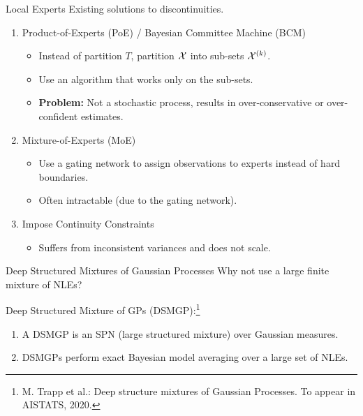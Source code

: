 \begin{frame}{Local Experts}
Existing solutions to discontinuities.
\begin{enumerate}
    \item Product-of-Experts (PoE) / Bayesian Committee Machine (BCM)
  \begin{itemize}
    \item Instead of partition $T$, partition $\mathcal{X}$ into sub-sets $\mathcal{X}^{(k)}$.
    \item Use an algorithm that works only on the sub-sets.
    \item \textbf{Problem:} Not a stochastic process, results in over-conservative or over-confident estimates.
  \end{itemize}
  \item Mixture-of-Experts (MoE)
  \begin{itemize}
    \item Use a gating network to assign observations to experts instead of hard boundaries.
    \item Often intractable (due to the gating network).
  \end{itemize}
  \item Impose Continuity Constraints
  \begin{itemize}
    \item Suffers from inconsistent variances and does not scale.
  \end{itemize}
\end{enumerate}
\end{frame}

\begin{frame}{Deep Structured Mixtures of Gaussian Processes}
Why not use a large finite mixture of NLEs?
\pause

Deep Structured Mixture of GPs (DSMGP):\footnote{\scriptsize M. Trapp et al.: Deep structure mixtures of Gaussian Processes. To appear in AISTATS, 2020.}
\begin{enumerate}
  \item A DSMGP is an SPN (large structured mixture) over Gaussian measures.
  \item DSMGPs perform exact Bayesian model averaging over a large set of NLEs.
\end{enumerate}
\end{frame}

